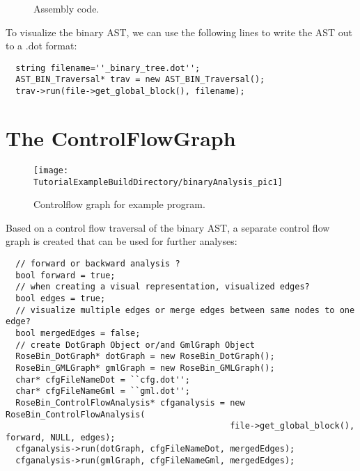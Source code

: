 \begin{figure}[!h]
{\indent
{\mySmallFontSize


\begin{latexonly}
   
\end{latexonly}

\begin{htmlonly}
   
\end{htmlonly}

}
}
\caption{Assembly code.}
\label{Tutorial:examplesourcecode2}
\end{figure}


To visualize the binary AST, we can use the following lines to
write the AST out to a .dot format:

{\mySmallFontSize
\begin{verbatim}
  string filename=''_binary_tree.dot'';
  AST_BIN_Traversal* trav = new AST_BIN_Traversal();
  trav->run(file->get_global_block(), filename);
\end{verbatim}
}


\section{The ControlFlowGraph}

\begin{figure}
\texttt{[image: \\TutorialExampleBuildDirectory/binaryAnalysis\_pic1]}
\caption{Controlflow graph for example program.}
\label{Tutorial:examplefig1}
\end{figure}

Based on a control flow traversal of the binary AST, a separate control flow graph
is created that can be used for further analyses:


{\mySmallFontSize
\begin{verbatim}
  // forward or backward analysis ?
  bool forward = true;
  // when creating a visual representation, visualized edges?
  bool edges = true;
  // visualize multiple edges or merge edges between same nodes to one edge?
  bool mergedEdges = false;
  // create DotGraph Object or/and GmlGraph Object
  RoseBin_DotGraph* dotGraph = new RoseBin_DotGraph();
  RoseBin_GMLGraph* gmlGraph = new RoseBin_GMLGraph();
  char* cfgFileNameDot = ``cfg.dot'';
  char* cfgFileNameGml = ``gml.dot'';
  RoseBin_ControlFlowAnalysis* cfganalysis = new RoseBin_ControlFlowAnalysis(
                                             file->get_global_block(), forward, NULL, edges);
  cfganalysis->run(dotGraph, cfgFileNameDot, mergedEdges);
  cfganalysis->run(gmlGraph, cfgFileNameGml, mergedEdges);
\end{verbatim}
}

